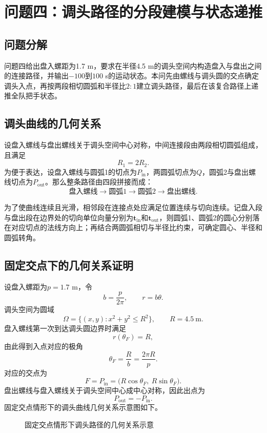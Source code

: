 \section{问题四：调头路径的分段建模与状态递推}
\subsection{问题分解}
问题四给出盘入螺距为1.7 m，要求在半径4.5 m的调头空间内构造盘入与盘出之间的连接路径，并输出$-100$到$100$ s的运动状态。本问先由螺线与调头圆的交点确定调头入点，再按两段相切圆弧和半径比$2:1$建立调头路径，最后在该复合路径上递推全队把手状态。

\subsection{调头曲线的几何关系}
设盘入螺线与盘出螺线关于调头空间中心对称，中间连接段由两段相切圆弧组成，且满足
\[
R_1=2R_2.
\]
为便于表达，设盘入螺线与圆弧1的切点为$P_{\mathrm{in}}$，两圆弧切点为$Q$，圆弧2与盘出螺线切点为$P_{\mathrm{out}}$。那么整条路径由四段拼接而成：
\[
\text{盘入螺线}\to \text{圆弧1}\to \text{圆弧2}\to \text{盘出螺线}.
\]

为了使曲线连续且光滑，相邻段在连接点处应满足位置连续与切向连续。记盘入段与盘出段在边界处的切向单位向量分别为$\bm t_{\mathrm{in}}$和$\bm t_{\mathrm{out}}$，则圆弧1、圆弧2的圆心分别落在对应切点的法线方向上；再结合两圆弧相切与半径比约束，可确定圆心、半径和圆弧转角。

\subsection{固定交点下的几何关系证明}
设盘入螺距为$p=1.7$ m，令
\[
b=\frac{p}{2\pi},\qquad r=b\theta.
\]
调头空间为圆域
\[
\Omega=\{(x,y):x^2+y^2\le R^2\},\qquad R=4.5\ \text{m}.
\]
盘入螺线第一次到达调头圆边界时满足
\[
r(\theta_F)=R,
\]
由此得到入点对应的极角
\[
\theta_F=\frac{R}{b}=\frac{2\pi R}{p}.
\]
对应的交点为
\[
F=P_{\mathrm{in}}=
\bigl(R\cos\theta_F,\ R\sin\theta_F\bigr).
\]
盘出螺线与盘入螺线关于调头空间中心成中心对称，因此出点为
\[
P_{\mathrm{out}}=-P_{\mathrm{in}}.
\]
固定交点情形下的调头曲线几何关系示意图如下。

\begin{figure}[H]
\centering
{}
\caption{固定交点情形下调头路径的几何关系示意}
\label{fig:q4-fixed-intersection}
\end{figure}

